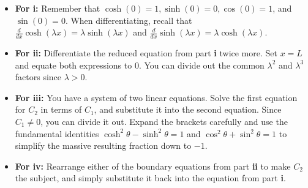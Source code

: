 \begin{hint}
\begin{itemize}
    \item \textbf{For i:} Remember that $\cosh(0)=1, \sinh(0)=0, \cos(0)=1$, and $\sin(0)=0$. When differentiating, recall that $\frac{d}{dx}\cosh(\lambda x) = \lambda\sinh(\lambda x)$ and $\frac{d}{dx}\sinh(\lambda x) = \lambda\cosh(\lambda x)$.
    \item \textbf{For ii:} Differentiate the reduced equation from part \textbf{i} twice more. Set $x=L$ and equate both expressions to $0$. You can divide out the common $\lambda^2$ and $\lambda^3$ factors since $\lambda > 0$.
    \item \textbf{For iii:} You have a system of two linear equations. Solve the first equation for $C_2$ in terms of $C_1$, and substitute it into the second equation. Since $C_1 \neq 0$, you can divide it out. Expand the brackets carefully and use the fundamental identities $\cosh^2 \theta - \sinh^2 \theta = 1$ and $\cos^2 \theta + \sin^2 \theta = 1$ to simplify the massive resulting fraction down to $-1$.
    \item \textbf{For iv:} Rearrange either of the boundary equations from part \textbf{ii} to make $C_2$ the subject, and simply substitute it back into the equation from part \textbf{i}.
\end{itemize}
\end{hint}


